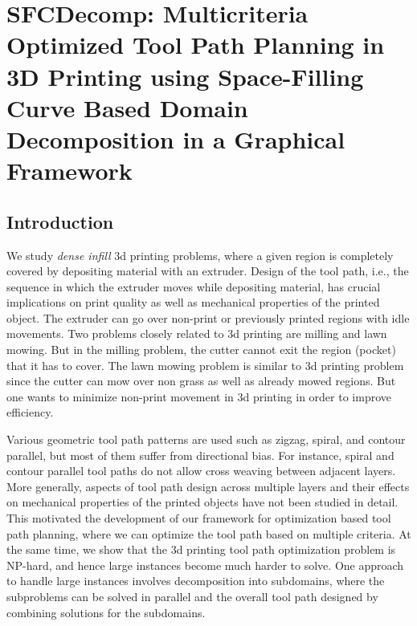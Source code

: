 \chapter{SFCDecomp: Multicriteria Optimized Tool Path Planning in 3D Printing using Space-Filling Curve Based Domain Decomposition in a Graphical Framework}

\section{Introduction}
  We study {\it dense infill} 3d printing problems, where a given region is completely covered by depositing material with an extruder.
  Design of the tool path, i.e., the sequence in which the extruder moves while depositing material, has crucial implications on print quality as well as mechanical properties of the printed object.
  The extruder can go over non-print or previously printed regions with idle movements.
  Two problems closely related to 3d printing are milling and lawn mowing.
  But in the milling problem, the cutter cannot exit the region (pocket) that it has to cover.  
  The lawn mowing problem is similar to 3d printing problem since the cutter can mow over non grass as well as already mowed regions.
  But one wants to minimize non-print movement in 3d printing in order to improve efficiency.
  
  Various geometric tool path patterns are used such as zigzag, spiral, and contour parallel, but most of them suffer from directional bias.
  For instance, spiral and contour parallel tool paths do not allow cross weaving between adjacent layers.
  More generally, aspects of tool path design across multiple layers and their effects on mechanical properties of the printed objects have not been studied in detail.
  This motivated the development of our framework for optimization based tool path planning, where we can optimize the tool path based on multiple criteria.
  At the same time, we show that the 3d printing tool path optimization problem is NP-hard, and hence large instances become much harder to solve.
  One approach to handle large instances involves decomposition into subdomains, where the subproblems can be solved in parallel and the overall tool path designed by combining solutions for the subdomains.


